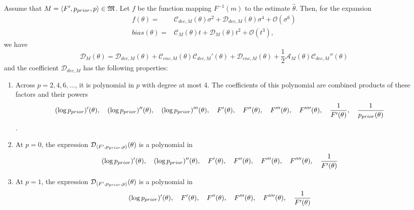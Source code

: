 \begin{lemma}\label{lemma:d-formula}\label{lemma:decoding-function-expansion}
Assume that $M = \langle F', p_{prior}, p\rangle \in \mathfrak{M}$.
Let $f$ be the function mapping $F^{-1}(m)$ to the estimate $\widehat{\theta}$.
Then, for the expansion
\begin{align*}
f(\theta) =& \mathcal{C}_{dec,M}(\theta) \sigma^2 + \mathcal{D}_{dec,M}(\theta) \sigma^4 + \mathcal{O}(\sigma^6)     \\
    bias(\theta) =& \mathcal{C}_{M}(\theta)t + \mathcal{D}_{M}(\theta)t^2 + \mathcal{O}(t^3),
\end{align*}
we have
\begin{equation}\label{eq:dm-decomposition}
    \mathcal{D}_M(\theta) = \mathcal{D}_{dec,M}(\theta) + \mathcal{C}_{enc,M}(\theta) \mathcal{C}_{dec,M}'(\theta) +  \mathcal{D}_{enc,M}(\theta) +  \frac{1}{2}  \mathcal{A}_M(\theta)   \mathcal{C}_{dec,M}''(\theta)
\end{equation}
and the coefficient $\mathcal{D}_{dec,M}$ has the following properties:
    \begin{enumerate}
        \item Across $p=2,4,6,\dots$, it is polynomial in $p$ with degree at most 4. The coefficients of this polynomial are combined products of these factors and their powers 
        \[
            (\log p_{prior})'(\theta), \quad (\log p_{prior})''(\theta), \quad (\log p_{prior})'''(\theta), \quad F'(\theta), \quad F''(\theta), \quad F'''(\theta), \quad F''''(\theta), \quad \frac{1}{F'(\theta)}, \quad \frac{1}{p_{prior}(\theta)}
        \].
        
        \item At $p=0$, the expression $\mathcal{D}_{\langle F', p_{prior}, p\rangle}(\theta)$ is a polynomial in
        \[
            (\log p_{prior})'(\theta), \quad (\log p_{prior})''(\theta), \quad F'(\theta), \quad F''(\theta), \quad F'''(\theta), \quad F''''(\theta), \quad \frac{1}{F'(\theta)}
        \]
        
        \item At $p=1$, the expression $\mathcal{D}_{\langle F', p_{prior}, p\rangle}(\theta)$ is a polynomial in
        \[
            (\log p_{prior})'(\theta), \quad F'(\theta), \quad F''(\theta), \quad F'''(\theta), \quad F''''(\theta), \quad \frac{1}{F'(\theta)}
        \]
    \end{enumerate}
\end{lemma}

